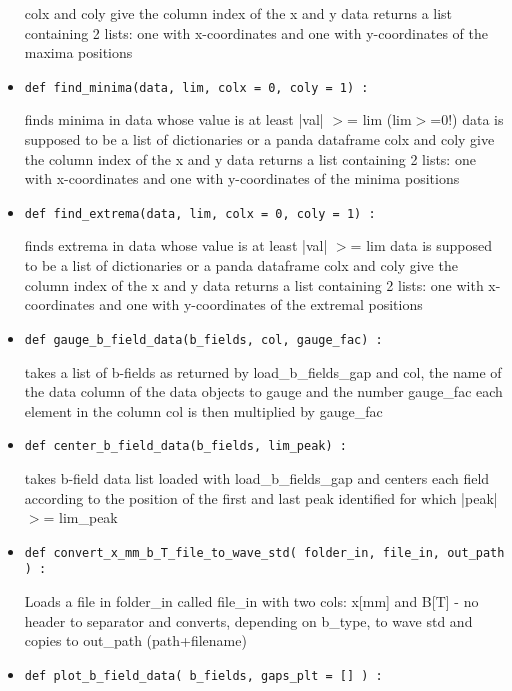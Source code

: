 \documentclass[
12pt,%
a4paper,  %
twoside        %
]{report}
\begin{document}
\begin{landscape}
\begin{itemize}
colx and coly give the column index of the x and y data
returns a list containing 2 lists: one with x-coordinates and one 
with y-coordinates of the maxima positions
\item \begin{verbatim}
def find_minima(data, lim, colx = 0, coly = 1) :
\end{verbatim}
finds minima in data whose value is at least |val| $>$= lim (lim$>$=0!)
data is supposed to be a list of dictionaries or a panda dataframe 
colx and coly give the column index of the x and y data
returns a list containing 2 lists: one with x-coordinates and one 
with y-coordinates of the minima positions
\item \begin{verbatim}
def find_extrema(data, lim, colx = 0, coly = 1) :
\end{verbatim}
finds extrema in data whose value is at least |val| $>$= lim
data is supposed to be a list of dictionaries or a panda dataframe 
colx and coly give the column index of the x and y data
returns a list containing 2 lists: one with x-coordinates and one 
with y-coordinates of the extremal positions
\item \begin{verbatim}
def gauge_b_field_data(b_fields, col, gauge_fac) :
\end{verbatim}
takes a list of b-fields as returned by load\_b\_fields\_gap and col, the name of the 
data column of the data objects to gauge and the number gauge\_fac
each element in the column col is then multiplied by gauge\_fac
\item \begin{verbatim}
def center_b_field_data(b_fields, lim_peak) :
\end{verbatim}
takes b-field data list loaded with load\_b\_fields\_gap and centers each field 
according to the position of the first and last peak identified for which |peak| $>$= lim\_peak
\item \begin{verbatim}
def convert_x_mm_b_T_file_to_wave_std( folder_in, file_in, out_path ) :
\end{verbatim}
Loads a file in folder\_in called file\_in with two cols: x[mm] and B[T] - no header to separator
and converts, depending on b\_type, to wave std and copies to out\_path (path+filename)
\item \begin{verbatim}
def plot_b_field_data( b_fields, gaps_plt = [] ) :
\end{verbatim}

\end{itemize}
\end{landscape}
\end{document}
